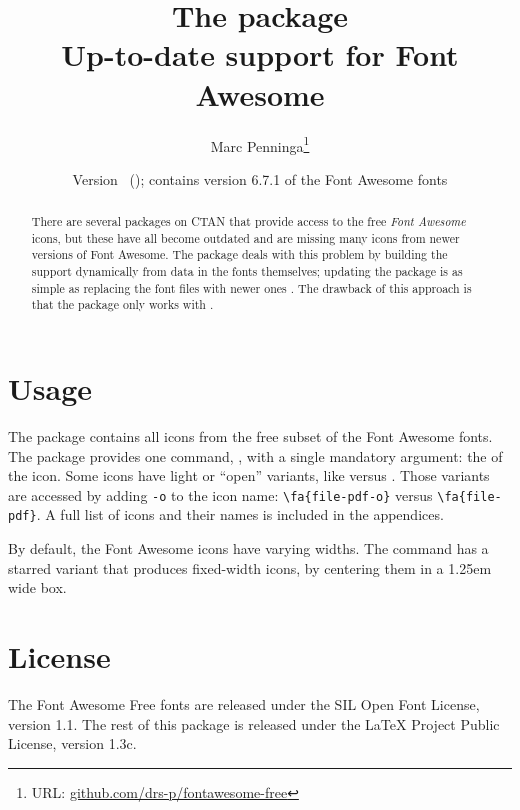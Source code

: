 \documentclass[10pt, a4paper]{ltxdoc}
\begin{document}
\title{The \textsf{\jobname} package\\Up-to-date  support for Font Awesome }
\author{Marc Penninga\thanks{URL: \href{https://github.com/drs-p/fontawesome-free}{ github.com/drs-p/fontawesome-free}}}
\makeatletter
\date{Version \fontawesome@free@version\ (\fontawesome@free@date); contains version 6.7.1 of the Font Awesome fonts}
\makeatother
\maketitle

\begin{abstract}
    There are several packages on CTAN that provide access to the free \emph{Font Awesome} icons, but these have all become outdated and are missing many icons from newer versions of Font Awesome.
    The \textsf{\jobname} package deals with this problem by building the  support dynamically from data in the fonts themselves; updating the package is as simple as replacing the font files with newer ones . The drawback of this approach is that the package only works with  .
\end{abstract}

\tableofcontents

\section{Usage}
The \textsf{\jobname} package contains all icons from the free subset of the Font Awesome fonts. \DescribeMacro{\fa}The package provides one command, , with a single mandatory argument: the  of the icon. Some icons have light or ``open'' variants, like  versus . Those variants are accessed by adding \texttt{-o} to the icon name: \verb|\fa{file-pdf-o}| versus \verb|\fa{file-pdf}|. A full list of icons and their names is included in the appendices.

By default, the Font Awesome icons have varying widths. \DescribeMacro{\fa*}The  command has a starred variant  that produces fixed-width icons, by centering them in a 1.25em wide box.

\section*{License}
The Font Awesome Free fonts are released under the SIL Open Font License, version 1.1.
The rest of this package is released under the LaTeX Project Public License, version 1.3c.
\end{document}
